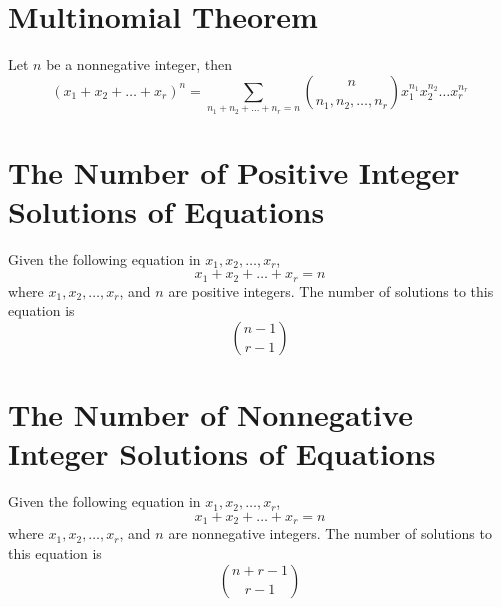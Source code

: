 \documentclass[../st2131_notes.tex]{subfiles}
\begin{document}
\section{Multinomial Theorem}
Let \(n\) be a nonnegative integer, then
\[(x_1+x_2+\ldots+x_r)^n=\sum_{n_1+n_2+\ldots+n_r=n}\binom{n}{n_1,n_2,\ldots,n_r}x_1^{n_1}x_2^{n_2}\ldots x_r^{n_r}\]

\section{The Number of Positive Integer Solutions of Equations}
Given the following equation in \(x_1, x_2, \ldots, x_r\),
\[x_1+x_2+\ldots+x_r=n\]
where \(x_1, x_2, \ldots, x_r\), and \(n\) are positive integers. The number of solutions to this equation is
\[\binom{n-1}{r-1}\]

\section{The Number of Nonnegative Integer Solutions of Equations}
Given the following equation in \(x_1, x_2, \ldots, x_r\),
\[x_1+x_2+\ldots+x_r=n\]
where \(x_1, x_2, \ldots, x_r\), and \(n\) are nonnegative integers. The number of solutions to this equation is
\[\binom{n+r-1}{r-1}\]
\end{document}
